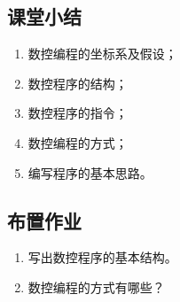 \subsection{课堂小结}
\begin{enumerate}[1、]
\item 数控编程的坐标系及假设；

\item 数控程序的结构；
\item 数控程序的指令；
\item 数控编程的方式；
\item 编写程序的基本思路。
\end{enumerate}
\vfill
\subsection{布置作业}
\begin{enumerate}[1、]
	\item 写出数控程序的基本结构。
	\item 数控编程的方式有哪些？
\end{enumerate}
\vfill